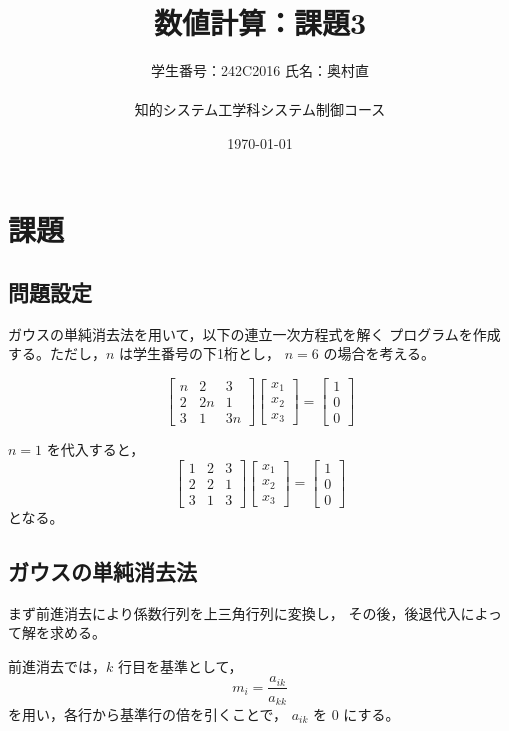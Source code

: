 \documentclass[10pt,a4paper,titlepage]{jreport} %
\title{数値計算：課題3} %
\author{
  学生番号：242C2016  氏名：奥村直 \\
  \\
  知的システム工学科システム制御コース
  } %
\date{\today} %
\begin{document}
\maketitle

\section*{課題}

\subsection*{問題設定}
ガウスの単純消去法を用いて，以下の連立一次方程式を解く
プログラムを作成する。ただし，$n$ は学生番号の下1桁とし，
$n=6$ の場合を考える。

\[
\begin{bmatrix}
n & 2 & 3 \\
2 & 2n & 1 \\
3 & 1 & 3n
\end{bmatrix}
\begin{bmatrix}
x_1 \\ x_2 \\ x_3
\end{bmatrix}
=
\begin{bmatrix}
1 \\ 0 \\ 0
\end{bmatrix}
\]

$n=1$ を代入すると，
\[
\begin{bmatrix}
1 & 2 & 3 \\
2 & 2 & 1 \\
3 & 1 & 3
\end{bmatrix}
\begin{bmatrix}
x_1 \\ x_2 \\ x_3
\end{bmatrix}
=
\begin{bmatrix}
1 \\ 0 \\ 0
\end{bmatrix}
\]
となる。

\subsection*{ガウスの単純消去法}
まず前進消去により係数行列を上三角行列に変換し，
その後，後退代入によって解を求める。

前進消去では，$k$ 行目を基準として，
\[
m_i = \frac{a_{ik}}{a_{kk}}
\]
を用い，各行から基準行の倍を引くことで，
$a_{ik}$ を $0$ にする。
\end{document}
